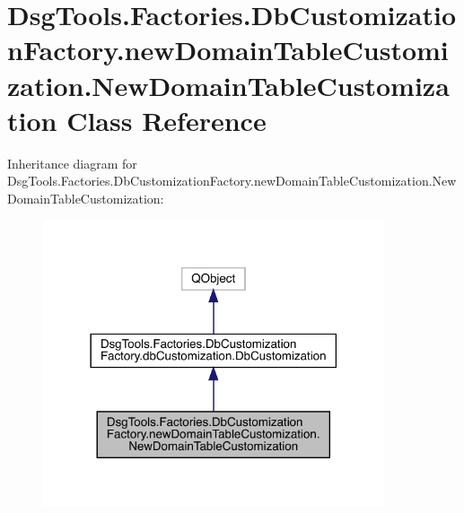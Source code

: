 \hypertarget{class_dsg_tools_1_1_factories_1_1_db_customization_factory_1_1new_domain_table_customization_1_1_new_domain_table_customization}{}\section{Dsg\+Tools.\+Factories.\+Db\+Customization\+Factory.\+new\+Domain\+Table\+Customization.\+New\+Domain\+Table\+Customization Class Reference}
\label{class_dsg_tools_1_1_factories_1_1_db_customization_factory_1_1new_domain_table_customization_1_1_new_domain_table_customization}


Inheritance diagram for Dsg\+Tools.\+Factories.\+Db\+Customization\+Factory.\+new\+Domain\+Table\+Customization.\+New\+Domain\+Table\+Customization\+:
\nopagebreak
\begin{figure}[H]
\begin{center}
\leavevmode
\includegraphics[width=285pt]{class_dsg_tools_1_1_factories_1_1_db_customization_factory_1_1new_domain_table_customization_1_18060e2ed4070ca3c0971383975b843ff}
\end{center}
\end{figure}


